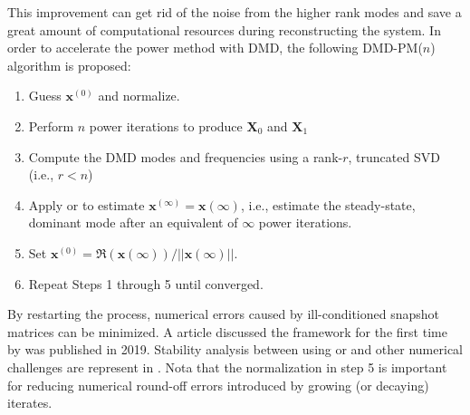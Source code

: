 This improvement can get rid of the noise from the higher rank modes and save a great amount of computational resources during reconstructing the system.
In order to accelerate the power method with DMD, the following DMD-PM($n$) algorithm is proposed:
\begin{enumerate}
 \item Guess $\mathbf{x}^{(0)}$ and normalize.
 \item Perform $n$ power iterations to produce $\mathbf{X}_0$ and $\mathbf{X}_1$
 \item Compute the DMD modes and frequencies using a rank-$r$, truncated  SVD (i.e., $r < n$)
 \item Apply  or  to estimate $\mathbf{x}^{(\infty)}=\mathbf{x}(\infty)$, i.e., estimate the steady-state, dominant mode after an equivalent of $\infty$ power iterations.
 \item Set $\mathbf{x}^{(0)} = \Re(\mathbf{x}(\infty)) / ||\mathbf{x}(\infty)||$.  
 \item Repeat Steps 1 through 5 until converged.
\end{enumerate}
By restarting the process, numerical errors caused by ill-conditioned snapshot matrices can be minimized.
A article discussed the framework for the first time by \citet{roberts2019acceleration} was published in 2019.
Stability analysis between using  or  and other numerical challenges are represent in .
Nota that the normalization in step 5 is important for reducing numerical round-off errors introduced by growing (or decaying) iterates.

